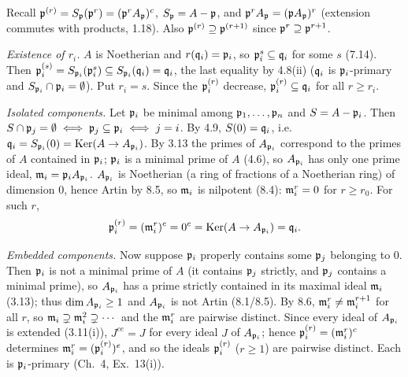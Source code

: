 \documentclass[11pt]{article}
\begin{document}
\pf
Recall $\mathfrak p^{(r)}=S_\mathfrak p(\mathfrak p^r)=(\mathfrak p^rA_\mathfrak p)^c$, $S_\mathfrak p=A-\mathfrak p$, and $\mathfrak p^rA_\mathfrak p=(\mathfrak p A_\mathfrak p)^r$ (extension commutes with products, 1.18). Also $\mathfrak p^{(r)}\supseteq\mathfrak p^{(r+1)}$ since $\mathfrak p^r\supseteq\mathfrak p^{r+1}$.

\emph{Existence of $r_i$.} $A$ is Noetherian and $r(\mathfrak q_i)=\mathfrak p_i$, so $\mathfrak p_i^s\subseteq\mathfrak q_i$ for some $s$ (7.14). Then $\mathfrak p_i^{(s)}=S_{\mathfrak p_i}(\mathfrak p_i^s)\subseteq S_{\mathfrak p_i}(\mathfrak q_i)=\mathfrak q_i$, the last equality by 4.8(ii) ($\mathfrak q_i$ is $\mathfrak p_i$-primary and $S_{\mathfrak p_i}\cap\mathfrak p_i=\emptyset$). Put $r_i=s$. Since the $\mathfrak p_i^{(r)}$ decrease, $\mathfrak p_i^{(r)}\subseteq\mathfrak q_i$ for all $r\ge r_i$.

\emph{Isolated components.} Let $\mathfrak p_i$ be minimal among $\mathfrak p_1,\dots,\mathfrak p_n$ and $S=A-\mathfrak p_i$. Then $S\cap\mathfrak p_j=\emptyset\iff\mathfrak p_j\subseteq\mathfrak p_i\iff j=i$. By 4.9, $S(0)=\mathfrak q_i$, i.e.\ $\mathfrak q_i=S_{\mathfrak p_i}(0)=\operatorname{Ker}(A\to A_{\mathfrak p_i})$. By 3.13 the primes of $A_{\mathfrak p_i}$ correspond to the primes of $A$ contained in $\mathfrak p_i$; $\mathfrak p_i$ is a minimal prime of $A$ (4.6), so $A_{\mathfrak p_i}$ has only one prime ideal, $\mathfrak m_i=\mathfrak p_iA_{\mathfrak p_i}$. $A_{\mathfrak p_i}$ is Noetherian (a ring of fractions of a Noetherian ring) of dimension $0$, hence Artin by 8.5, so $\mathfrak m_i$ is nilpotent (8.4): $\mathfrak m_i^r=0$ for $r\ge r_0$. For such $r$,
\[
\mathfrak p_i^{(r)}=(\mathfrak m_i^r)^c=0^c=\operatorname{Ker}(A\to A_{\mathfrak p_i})=\mathfrak q_i .
\]

\emph{Embedded components.} Now suppose $\mathfrak p_i$ properly contains some $\mathfrak p_j$ belonging to $0$. Then $\mathfrak p_i$ is not a minimal prime of $A$ (it contains $\mathfrak p_j$ strictly, and $\mathfrak p_j$ contains a minimal prime), so $A_{\mathfrak p_i}$ has a prime strictly contained in its maximal ideal $\mathfrak m_i$ (3.13); thus $\dim A_{\mathfrak p_i}\ge1$ and $A_{\mathfrak p_i}$ is not Artin (8.1/8.5). By 8.6, $\mathfrak m_i^r\ne\mathfrak m_i^{r+1}$ for all $r$, so $\mathfrak m_i\supsetneq\mathfrak m_i^2\supsetneq\cdots$ and the $\mathfrak m_i^r$ are pairwise distinct. Since every ideal of $A_{\mathfrak p_i}$ is extended (3.11(i)), $J^{ce}=J$ for every ideal $J$ of $A_{\mathfrak p_i}$; hence $\mathfrak p_i^{(r)}=(\mathfrak m_i^r)^c$ determines $\mathfrak m_i^r=(\mathfrak p_i^{(r)})^e$, and so the ideals $\mathfrak p_i^{(r)}$ ($r\ge1$) are pairwise distinct. Each is $\mathfrak p_i$-primary (Ch.~4, Ex.~13(i)).
\end{document}
